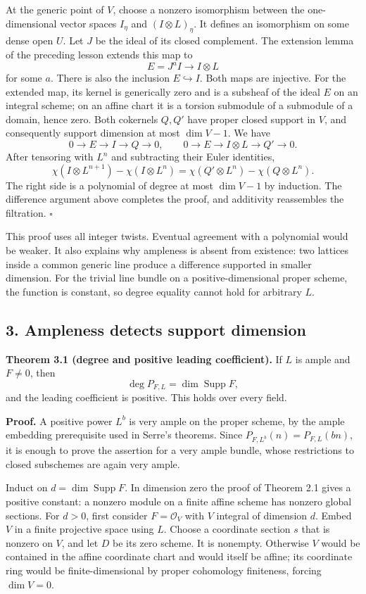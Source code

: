 \documentclass[11pt]{article}
\begin{document}
At the generic point of \(V\), choose a nonzero isomorphism between the
one-dimensional vector spaces \(I_\eta\) and \((I\otimes L)_\eta\). It
defines an isomorphism on some dense open \(U\). Let \(J\) be the ideal
of its closed complement. The extension lemma of the preceding lesson
extends this map to \[
E=J^aI\longrightarrow I\otimes L
\] for some \(a\). There is also the inclusion \(E\hookrightarrow I\).
Both maps are injective. For the extended map, its kernel is generically
zero and is a subsheaf of the ideal \(E\) on an integral scheme; on an
affine chart it is a torsion submodule of a submodule of a domain, hence
zero. Both cokernels \(Q,Q'\) have proper closed support in \(V\), and
consequently support dimension at most \(\dim V-1\). We have \[
0\to E\to I\to Q\to0,
\qquad 0\to E\to I\otimes L\to Q'\to0.
\] After tensoring with \(L^n\) and subtracting their Euler identities,
\[
\chi(I\otimes L^{n+1})-\chi(I\otimes L^n)
=\chi(Q'\otimes L^n)-\chi(Q\otimes L^n).
\] The right side is a polynomial of degree at most \(\dim V-1\) by
induction. The difference argument above completes the proof, and
additivity reassembles the filtration. \(\square\)

This proof uses all integer twists. Eventual agreement with a polynomial
would be weaker. It also explains why ampleness is absent from
existence: two lattices inside a common generic line produce a
difference supported in smaller dimension. For the trivial line bundle
on a positive-dimensional proper scheme, the function is constant, so
degree equality cannot hold for arbitrary \(L\).

\subsection{3. Ampleness detects support
dimension}\label{ampleness-detects-support-dimension}

\textbf{Theorem 3.1 (degree and positive leading coefficient).} If \(L\)
is ample and \(F\ne0\), then \[
\deg P_{F,L}=\dim\operatorname{Supp}F,
\] and the leading coefficient is positive. This holds over every field.

\textbf{Proof.} A positive power \(L^b\) is very ample on the proper
scheme, by the ample embedding prerequisite used in Serre's theorems.
Since \(P_{F,L^b}(n)=P_{F,L}(bn)\), it is enough to prove the assertion
for a very ample bundle, whose restrictions to closed subschemes are
again very ample.

Induct on \(d=\dim\operatorname{Supp}F\). In dimension zero the proof of
Theorem 2.1 gives a positive constant: a nonzero module on a finite
affine scheme has nonzero global sections. For \(d>0\), first consider
\(F=\mathcal O_V\) with \(V\) integral of dimension \(d\). Embed \(V\)
in a finite projective space using \(L\). Choose a coordinate section
\(s\) that is nonzero on \(V\), and let \(D\) be its zero scheme. It is
nonempty. Otherwise \(V\) would be contained in the affine coordinate
chart and would itself be affine; its coordinate ring would be
finite-dimensional by proper cohomology finiteness, forcing
\(\dim V=0\).
\end{document}
